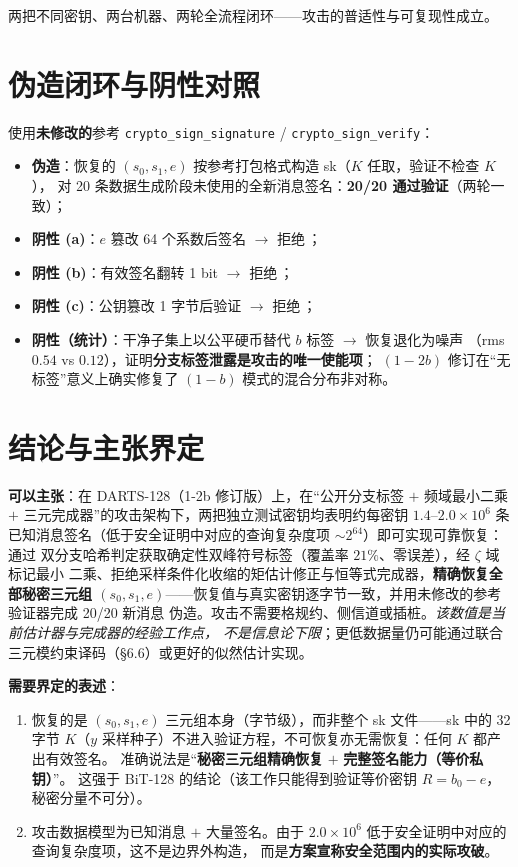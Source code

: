 \documentclass[UTF8,11pt,a4paper]{ctexart}
\newcommand{\code}[1]{\texttt{\small #1}}
\newcommand{\ok}{\,\checkmark}
\begin{document}
两把不同密钥、两台机器、两轮全流程闭环——攻击的普适性与可复现性成立。

\section{伪造闭环与阴性对照}

使用\textbf{未修改的}参考 \code{crypto\_sign\_signature} / \code{crypto\_sign\_verify}：

\begin{itemize}
\item \textbf{伪造}：恢复的 $(s_0,s_1,e)$ 按参考打包格式构造 sk（$K$ 任取，验证不检查 $K$），
      对 20 条数据生成阶段未使用的全新消息签名：\textbf{20/20 通过验证}（两轮一致）；
\item \textbf{阴性 (a)}：$e$ 篡改 64 个系数后签名 $\to$ 拒绝\ok；
\item \textbf{阴性 (b)}：有效签名翻转 1 bit $\to$ 拒绝\ok；
\item \textbf{阴性 (c)}：公钥篡改 1 字节后验证 $\to$ 拒绝\ok；
\item \textbf{阴性（统计）}：干净子集上以公平硬币替代 $b$ 标签 $\to$ 恢复退化为噪声
      （rms $0.54$ vs $0.12$），证明\textbf{分支标签泄露是攻击的唯一使能项}；
      $(1{-}2b)$ 修订在``无标签''意义上确实修复了 $(1{-}b)$ 模式的混合分布非对称。
\end{itemize}

\section{结论与主张界定}

\textbf{可以主张}：在 DARTS-128（1-2b 修订版）上，在``公开分支标签 $+$ 频域最小二乘
$+$ 三元完成器''的攻击架构下，两把独立测试密钥均表明约每密钥 $1.4$--$2.0\times10^{6}$
条已知消息签名（低于安全证明中对应的查询复杂度项 $\sim2^{64}$）即可实现可靠恢复：通过
双分支哈希判定获取确定性双峰符号标签（覆盖率 $21\%$、零误差），经 $\zeta$ 域标记最小
二乘、拒绝采样条件化收缩的矩估计修正与恒等式完成器，\textbf{精确恢复全部秘密三元组
$(s_0,s_1,e)$}——恢复值与真实密钥逐字节一致，并用未修改的参考验证器完成 20/20 新消息
伪造。攻击不需要格规约、侧信道或插桩。\emph{该数值是当前估计器与完成器的经验工作点，
不是信息论下限}；更低数据量仍可能通过联合三元模约束译码（\S6.6）或更好的似然估计实现。

\textbf{需要界定的表述}：
\begin{enumerate}
\item 恢复的是 $(s_0,s_1,e)$ 三元组本身（字节级），而非整个 sk 文件——sk 中的 32 字节
      $K$（$y$ 采样种子）不进入验证方程，不可恢复亦无需恢复：任何 $K$ 都产出有效签名。
      准确说法是``\textbf{秘密三元组精确恢复} $+$ \textbf{完整签名能力（等价私钥）}''。
      这强于 BiT-128 的结论（该工作只能得到验证等价密钥 $R=b_0-e$，秘密分量不可分）。
\item 攻击数据模型为已知消息 $+$ 大量签名。由于 $2.0\times10^{6}$ 低于安全证明中对应的查询复杂度项，这不是边界外构造，
      而是\textbf{方案宣称安全范围内的实际攻破}。
\end{enumerate}
\end{document}
